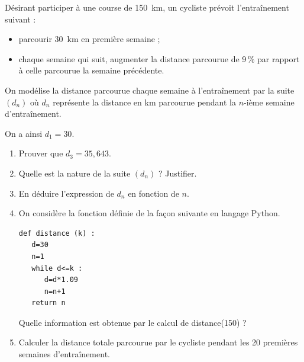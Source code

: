 \medskip

Désirant participer à une course de 150~km, un cycliste prévoit l'entraînement suivant :
\begin{itemize}
\item parcourir 30~km en première semaine ;
\item chaque semaine qui suit, augmenter la distance parcourue de 9\,\% par rapport à celle
parcourue la semaine précédente.
\end{itemize}
On modélise la distance parcourue chaque semaine à l'entraînement par la suite $\left(d_n\right)$ où $d_n$
représente la distance en km parcourue pendant la $n$-ième semaine d'entraînement.

On a ainsi $d_1 = 30$.

\medskip

\begin{enumerate}
\item Prouver que $d_3 = 35,643$.
\item Quelle est la nature de la suite $\left(d_n\right)$ ? Justifier.
\item En déduire l'expression de $d_n$ en fonction de $n$.
\item On considère la fonction définie de la façon suivante en langage Python.

\begin{lstlisting}[style=python]
 def distance (k) :
   d=30
   n=1
   while d<=k :
      d=d*1.09
 	  n=n+1
   return n
\end{lstlisting}

Quelle information est obtenue par le calcul de distance(150) ?
\item Calculer la distance totale parcourue par le cycliste pendant les 20 premières semaines
d'entraînement.

\end{enumerate}

\vspace{0,5cm}
